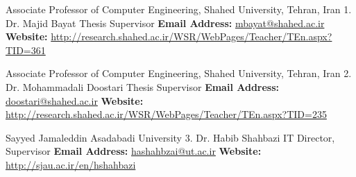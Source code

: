 

\begin{cventries}

  \cventry
    {Associate Professor of Computer Engineering, Shahed University, Tehran, Iran} 
    {1. Dr. Majid Bayat} 
    {Thesis Supervisor}
    {}
    {
      \textbf{Email Address:} \href{mailto:mbayat@shahed.ac.ir}{mbayat@shahed.ac.ir}
      \newline
      \textbf{Website:} \href{http://research.shahed.ac.ir/WSR/WebPages/Teacher/TEn.aspx?TID=361}{http://research.shahed.ac.ir/WSR/WebPages/Teacher/TEn.aspx?TID=361}
    }
  
  \cventry
    {Associate Professor of Computer Engineering, Shahed University, Tehran, Iran} 
    {2. Dr. Mohammadali Doostari} 
    {Thesis Supervisor}
    {}
    {
      \textbf{Email Address:} \href{mailto:doostari@shahed.ac.ir}{doostari@shahed.ac.ir}
      \newline
      \textbf{Website:} \href{http://research.shahed.ac.ir/WSR/WebPages/Teacher/TEn.aspx?TID=235}{http://research.shahed.ac.ir/WSR/WebPages/Teacher/TEn.aspx?TID=235}
    }

  \cventry
    {Sayyed Jamaleddin Asadabadi University} 
    {3. Dr. Habib Shahbazi} 
    {IT Director, Supervisor}
    {}
    {
      \textbf{Email Address:} \href{mailto:hashahbzai@ut.ac.ir}{hashahbzai@ut.ac.ir}
      \newline
      \textbf{Website:} \href{http://sjau.ac.ir/en/hshahbazi}{http://sjau.ac.ir/en/hshahbazi}
    }
\end{cventries}
